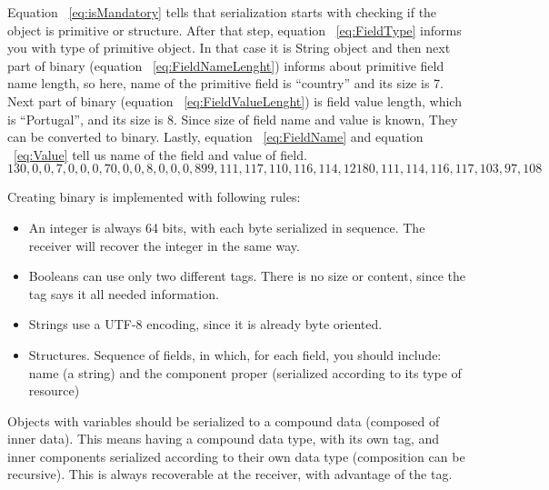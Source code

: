 Equation ~\ref{eq:isMandatory} tells that serialization starts with checking if the object is primitive or structure. After that step, equation ~\ref{eq:FieldType} informs you with type of primitive object. In that case it is String object and then next part of binary (equation ~\ref{eq:FieldNameLenght}) informs about primitive field name length, so here, name of the primitive field is “country” and its size is 7. Next part of binary (equation ~\ref{eq:FieldValueLenght}) is field value length, which is “Portugal”, and its size is 8. Since size of field name and value is known, They can be converted to binary. Lastly, equation ~\ref{eq:FieldName} and equation ~\ref{eq:Value} tell us name of the field and value of field.
\begin{subequations}
    \begin{equation}
    1
    \label{eq:isMandatory}
    \end{equation}
    \begin{equation}
    3
    \label{eq:FieldType}
    \end{equation}
    \begin{equation}
    0, 0, 0, 7, 0, 0, 0, 7
    \label{eq:FieldNameLenght}
    \end{equation}
    \begin{equation}
    0, 0, 0, 8, 0, 0, 0, 8
    \label{eq:FieldValueLenght}
    \end{equation}
    \begin{equation}
    99, 111, 117, 110, 116, 114, 121
    \label{eq:FieldName}
    \end{equation}
    \begin{equation}
    80, 111, 114, 116, 117, 103, 97, 108
    \label{eq:Value}
    \end{equation}
\label{eq:NavierStokes}%
\end{subequations}

Creating binary is implemented with following rules:

\begin{itemize}
\item 	An integer is always 64 bits, with each byte serialized in sequence. The receiver will recover the integer in the same way.
\item 	Booleans can use only two different tags. There is no size or content, since the tag says it all needed information.
\item 	Strings use a UTF-8 encoding, since it is already byte oriented.
\item 	Structures. Sequence of fields, in which, for each field, you should include: name (a string) and the component proper (serialized according to its type of resource)
\end{itemize}

Objects with variables should be serialized to a compound data (composed of inner data). This means having a compound data type, with its own tag, and inner components serialized according to their own data type (composition can be recursive). This is always recoverable at the receiver, with advantage of the tag.

